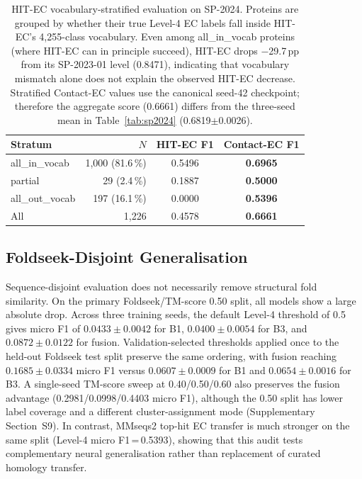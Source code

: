 \documentclass[numbered,contemporary,mediumone]{oup-authoring-template}
\begin{document}
\begin{table}[!htbp]
\centering
\caption{HIT-EC vocabulary-stratified evaluation on SP-2024. Proteins are
grouped by whether their true Level-4 EC labels fall inside HIT-EC's
4{,}255-class vocabulary. Even among all\_in\_vocab proteins (where HIT-EC
can in principle succeed), HIT-EC drops $-$29.7\,pp from its SP-2023-01
level (0.8471), indicating that vocabulary mismatch alone does not explain the
observed HIT-EC decrease. Stratified Contact-EC values use the canonical
seed-42 checkpoint; therefore the aggregate score (0.6661) differs from the
three-seed mean in Table~\ref{tab:sp2024} (0.6819$\pm$0.0026).}
\label{tab:vocab_strat}
\setlength{\tabcolsep}{4pt}
\begin{tabular}{lrcc}
\toprule
Stratum & $N$ & HIT-EC F1 & Contact-EC F1 \\
\midrule
all\_in\_vocab  & 1{,}000 (81.6\,\%) & 0.5496 & \textbf{0.6965} \\
partial         &    29  (2.4\,\%)  & 0.1887 & \textbf{0.5000} \\
all\_out\_vocab &   197  (16.1\,\%) & 0.0000 & \textbf{0.5396} \\
\midrule
All             & 1{,}226           & 0.4578 & \textbf{0.6661} \\
\bottomrule
\end{tabular}
\end{table}
\FloatBarrier

\subsection{Foldseek-Disjoint Generalisation}

Sequence-disjoint evaluation does not necessarily remove structural fold
similarity. On the primary Foldseek/TM-score 0.50 split, all models show a large
absolute drop. Across three training seeds, the default Level-4 threshold of 0.5
gives micro F1 of $0.0433\pm0.0042$ for B1, $0.0400\pm0.0054$ for B3, and
$0.0872\pm0.0122$ for fusion. Validation-selected thresholds applied once to the
held-out Foldseek test split preserve the same ordering, with fusion reaching
$0.1685\pm0.0334$ micro F1 versus $0.0607\pm0.0009$ for B1 and
$0.0654\pm0.0016$ for B3. A single-seed TM-score sweep at 0.40/0.50/0.60 also
preserves the fusion advantage (0.2981/0.0998/0.4403 micro F1), although the
0.50 split has lower label coverage and a different cluster-assignment mode
(Supplementary Section~S9). In contrast, MMseqs2 top-hit EC transfer is much
stronger on the same split (Level-4 micro F1\,=\,0.5393), showing that this audit
tests complementary neural generalisation rather than replacement of curated
homology transfer.
\end{document}

